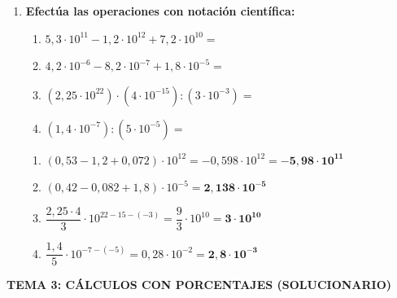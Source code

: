 \documentclass[a4paper,12pt]{article}
\begin{document}
\begin{enumerate}
    \item \textbf{Efectúa las operaciones con notación científica:}
        \begin{enumerate}[label=\alph*)]
            \item $5,3 \cdot 10^{11} - 1,2 \cdot 10^{12} + 7,2 \cdot 10^{10} = $
            \item $4,2 \cdot 10^{-6} - 8,2 \cdot  10^{-7} + 1,8 \cdot 10^{-5} = $
            \item $(2,25 \cdot 10^{22}) \cdot (4 \cdot 10^{-15}) : (3 \cdot 10^{-3})=$
            \item $(1,4 \cdot 10^{-7}) : (5 \cdot 10^{-5}) =$ 
        \end{enumerate}
        \begin{solucion}
            \begin{enumerate}[label=\alph*)]
                \item $(0,53 - 1,2 + 0,072) \cdot 10^{12} = -0,598 \cdot 10^{12} = \mathbf{-5,98 \cdot 10^{11}}$
                \item $(0,42 - 0,082 + 1,8) \cdot 10^{-5} = \mathbf{2,138 \cdot 10^{-5}}$
                \item $\dfrac{2,25 \cdot 4}{3} \cdot 10^{22 - 15 - (-3)} = \dfrac{9}{3} \cdot 10^{10} = \mathbf{3 \cdot 10^{10}}$
                \item $\dfrac{1,4}{5} \cdot 10^{-7 - (-5)} = 0,28 \cdot 10^{-2} = \mathbf{2,8 \cdot 10^{-3}}$
            \end{enumerate}
        \end{solucion}

\end{enumerate}

\vspace{0.5cm}

\begin{center}
    \Large\textbf{\color{primary} TEMA 3: CÁLCULOS CON PORCENTAJES (SOLUCIONARIO)}
\end{center}
\end{document}
